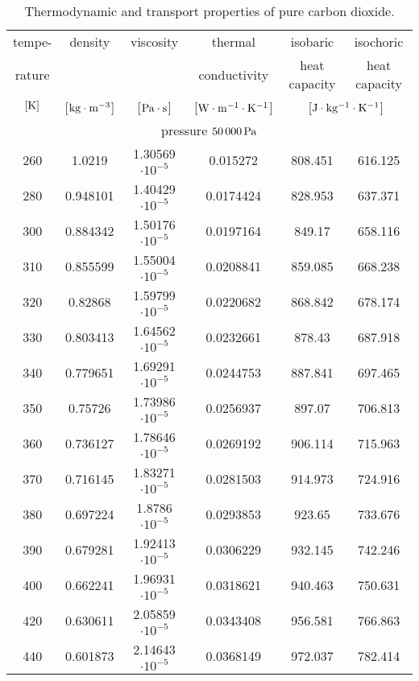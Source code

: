 \begin{table}
\caption{\label{tab-annex-a}Thermodynamic and transport properties of pure carbon dioxide.}
\begin{center}
\scriptsize
\begin{tabular}{cccccc}
\toprule
tempe-		& density	& viscosity		& thermal 				& isobaric 					& isochoric \\
rature		&			&				& conductivity			& heat capacity				& heat capacity\\
$[\unit[]{K}]$	&[$\unit[]{kg \cdot m^{-3}}$]		& [$\unit[]{Pa \cdot s}$]   & [$\unit[]{W \cdot m^{-1} \cdot K^{-1}}$] & \multicolumn{2}{c}{[$\unit[]{J \cdot kg^{-1} \cdot K^{-1}}$]} \\
\midrule
\multicolumn{6}{c}{pressure $\unit[50\,000]{Pa}$}\\
260			& 1.0219	& 1.30569 $ \cdot 10^{-5}$	& 0.015272				& 808.451					& 616.125\\
280			& 0.948101	& 1.40429 $ \cdot 10^{-5}$	& 0.0174424				& 828.953					& 637.371\\
300			& 0.884342	& 1.50176 $ \cdot 10^{-5}$	& 0.0197164				& 849.17					& 658.116\\
310			& 0.855599	& 1.55004 $ \cdot 10^{-5}$	& 0.0208841				& 859.085					& 668.238\\
320			& 0.82868	& 1.59799 $ \cdot 10^{-5}$	& 0.0220682				& 868.842					& 678.174\\
330			& 0.803413	& 1.64562 $ \cdot 10^{-5}$	& 0.0232661				& 878.43					& 687.918\\
340			& 0.779651	& 1.69291 $ \cdot 10^{-5}$	& 0.0244753				& 887.841					& 697.465\\
350			& 0.75726	& 1.73986 $ \cdot 10^{-5}$	& 0.0256937				& 897.07					& 706.813		\\
360			& 0.736127	& 1.78646 $ \cdot 10^{-5}$	& 0.0269192				& 906.114					& 715.963\\
370			& 0.716145	& 1.83271 $ \cdot 10^{-5}$	& 0.0281503				& 914.973					& 724.916\\
380			& 0.697224	& 1.8786 $ \cdot 10^{-5}$	& 0.0293853				& 923.65					& 733.676\\
390			& 0.679281	& 1.92413 $ \cdot 10^{-5}$	& 0.0306229				& 932.145					& 742.246\\
400			& 0.662241	& 1.96931 $ \cdot 10^{-5}$	& 0.0318621				& 940.463					& 750.631\\
420			& 0.630611	& 2.05859 $ \cdot 10^{-5}$	& 0.0343408				& 956.581					& 766.863\\
440			& 0.601873	& 2.14643 $ \cdot 10^{-5}$	& 0.0368149				& 972.037					& 782.414\\

\end{tabular}
\end{center}
\end{table}
